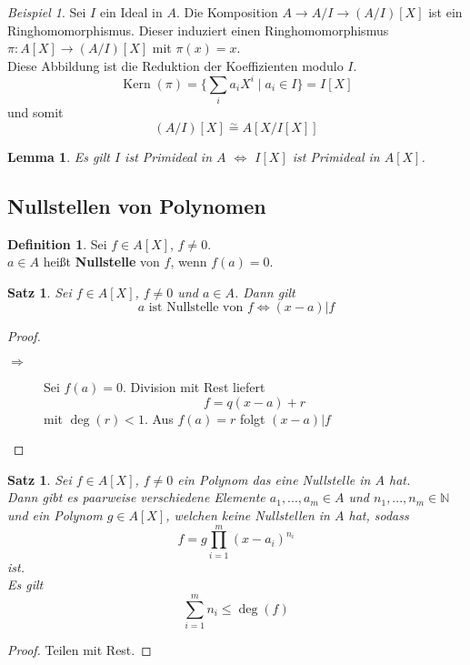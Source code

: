 \documentclass[10pt,a4paper]{article}
\newcommand{\N}{\ensuremath{\mathbb{N}}}
\newcommand{\isom}{\overset{\sim}{=}}
\newcommand{\Kern}{\operatorname{Kern}}
\theoremstyle{plain}
\newtheorem{lem}[theorem]{Lemma}
\newtheorem{satz}[theorem]{Satz}
\theoremstyle{definition}
\newtheorem{definition}[theorem]{Definition}
\theoremstyle{remark}
\newtheorem{exm}[theorem]{Beispiel}
\begin{document}
	\begin{exm}
		Sei $I$ ein Ideal in $A$. Die Komposition $A\to A/I\to(A/I)[X]$ ist ein Ringhomomorphismus. Dieser induziert einen Ringhomomorphismus $\pi:A[X]\to(A/I)[X]$ mit $\pi(x)=x$.\\
		Diese Abbildung ist die Reduktion der Koeffizienten modulo $I$.
		\[\Kern(\pi)=\{\sum_ia_iX^i\mid a_i\in I\}=I[X]\]
		und somit
		\[(A/I)[X]\isom A[X/I[X]]\]
	\end{exm}

	\begin{lem}
		Es gilt $I$ ist Primideal in $A$ $\Leftrightarrow$ $I[X]$ ist Primideal in $A[X]$.
	\end{lem}


	\subsection{Nullstellen von Polynomen}
	\begin{definition}
		Sei $f\in A[X]$, $f\neq 0$.\\
		$a\in A$ heißt \textbf{Nullstelle} von $f$, wenn $f(a)=0$.
	\end{definition}

	\begin{satz}
		Sei $f\in A[X]$, $f\neq 0$ und $a\in A$. Dann gilt
		\[\text{$a$ ist Nullstelle von $f$}\Leftrightarrow (x-a)|f\]
	\end{satz}
	\begin{proof}
		\begin{description}
			\item[$\Rightarrow$] Sei $f(a)=0$. Division mit Rest liefert
			\[ f=q(x-a)+r\]
			mit $\deg(r)< 1$. Aus $f(a)=r$ folgt $(x-a)|f$
		\end{description}
	\end{proof}

	\begin{satz}
		Sei $f\in A[X]$, $f\neq 0$ ein Polynom das eine Nullstelle in $A$ hat.\\
		Dann gibt es paarweise verschiedene Elemente $a_1,...,a_m\in A$ und $n_1,...,n_m\in\N$ und ein Polynom $g\in A[X]$, welchen keine Nullstellen in $A$ hat, sodass
		\[f=g\prod_{i=1}^m(x-a_i)^{n_i}\]
		ist.\\
		Es gilt
		\[\sum_{i=1}^{m}n_i\leq\deg(f)\]
	\end{satz}
	\begin{proof}
		Teilen mit Rest.
	\end{proof}
\end{document}
